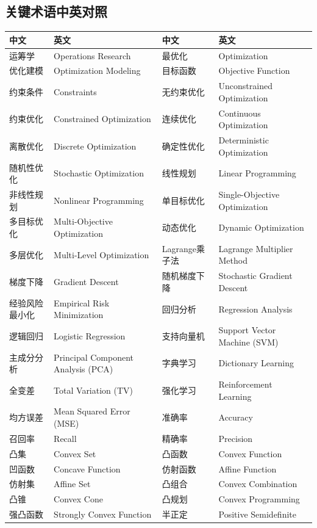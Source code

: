 \subsection{关键术语中英对照}

\begin{table}[htbp]
\centering
\footnotesize
\begin{tabular}{@{}p{2.3cm}p{4.6cm}p{2.3cm}p{4.6cm}@{}}
\toprule
\textbf{中文} & \textbf{英文} & \textbf{中文} & \textbf{英文} \\
\midrule
运筹学 & Operations Research & 最优化 & Optimization \\
优化建模 & Optimization Modeling & 目标函数 & Objective Function \\
约束条件 & Constraints & 无约束优化 & Unconstrained Optimization \\
约束优化 & Constrained Optimization & 连续优化 & Continuous Optimization \\
离散优化 & Discrete Optimization & 确定性优化 & Deterministic Optimization \\
随机性优化 & Stochastic Optimization & 线性规划 & Linear Programming \\
非线性规划 & Nonlinear Programming & 单目标优化 & Single-Objective Optimization \\
多目标优化 & Multi-Objective Optimization & 动态优化 & Dynamic Optimization \\
多层优化 & Multi-Level Optimization & Lagrange乘子法 & Lagrange Multiplier Method \\
梯度下降 & Gradient Descent & 随机梯度下降 & Stochastic Gradient Descent \\
经验风险最小化 & Empirical Risk Minimization & 回归分析 & Regression Analysis \\
逻辑回归 & Logistic Regression & 支持向量机 & Support Vector Machine (SVM) \\
主成分分析 & Principal Component Analysis (PCA) & 字典学习 & Dictionary Learning \\
全变差 & Total Variation (TV) & 强化学习 & Reinforcement Learning \\
均方误差 & Mean Squared Error (MSE) & 准确率 & Accuracy \\
召回率 & Recall & 精确率 & Precision \\
凸集 & Convex Set & 凸函数 & Convex Function \\
凹函数 & Concave Function & 仿射函数 & Affine Function \\
仿射集 & Affine Set & 凸组合 & Convex Combination \\
凸锥 & Convex Cone & 凸规划 & Convex Programming \\
强凸函数 & Strongly Convex Function & 半正定 & Positive Semidefinite \\
\bottomrule
\end{tabular}
\end{table}

\newpage

